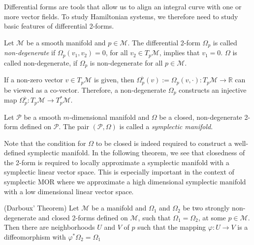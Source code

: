 Differential forms are tools that allow us to align an integral curve with one or more vector fields. To study Hamiltonian systems, we therefore need to study basic features of differential 2-forms.

\begin{definition}
	Let $\mathcal M$ be a smooth manifold and $p\in \mathcal M$. The differential 2-form $\Omega_p$ is called \emph{non-degenerate} if $\Omega_p(v_1,v_2)=0$, for all $v_2\in T_p \mathcal M$, implies that $v_1 = 0$. $\Omega$ is called non-degenerate, if $\Omega_p$ is non-degenerate for all $p\in \mathcal M$.
\end{definition}
If a non-zero vector $v\in T_p \mathcal M$ is given, then $\Omega_p^{\flat}(v):=\Omega_p(v,\cdot):T_p \mathcal M \to \mathbb R$ can be viewed as a co-vector. Therefore, a non-degenerate $\Omega_p$ constructs an injective map $\Omega_p^{\flat}:T_p\mathcal M \to T_p^* \mathcal M$. 

\begin{definition}
	Let $\mathcal P$ be a smooth $m$-dimensional manifold and $\Omega$ be a closed, non-degenerate 2-form defined on $\mathcal P$. The pair $(\mathcal P,\Omega)$ is called a \emph{symplectic manifold}.
\end{definition}
Note that the condition for $\Omega$ to be closed is indeed required to construct a well-defined symplectic manifold. In the following theorem, we see that closedness of the 2-form is required to locally approximate a symplectic manifold with a symplectic linear vector space. This is especially important in the context of symplectic MOR where we approximate a high dimensional symplectic manifold with a low dimensional linear vector space.

\begin{theorem} \label{theorem:2.5}
(Darboux' Theorem) Let $\mathcal M$ be a manifold and $\Omega_1$ and $\Omega_2$ be two strongly non-degenerate and closed 2-forms defined on $\mathcal M$, such that $\Omega_1 = \Omega_2$, at some $p\in \mathcal M$. Then there are neighborhoods $U$ and $V$ of $p$ such that the mapping $\varphi:U\to V$ is a diffeomorphism with $\varphi^* \Omega_2 = \Omega_1$
\end{theorem}

